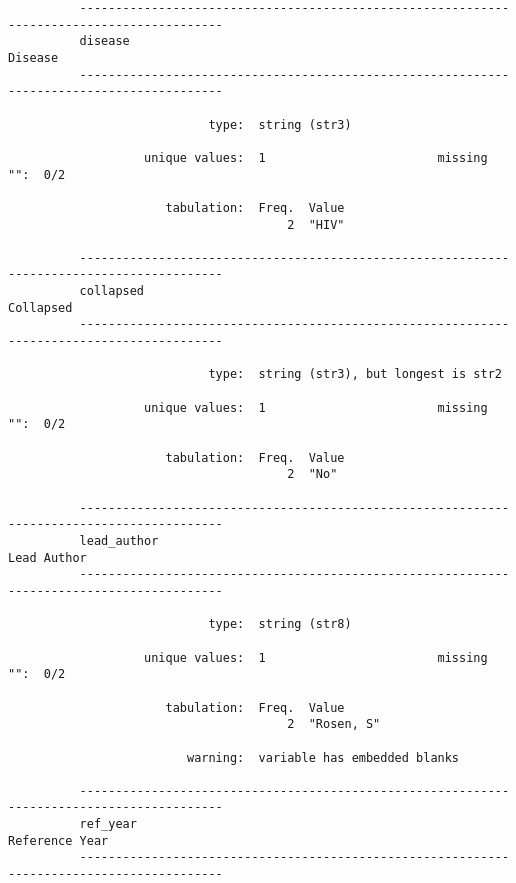 \documentclass{article}
\begin{document}
\begin{verbatim}
          
          
          
          ------------------------------------------------------------------------------------------
          disease                                                                            Disease
          ------------------------------------------------------------------------------------------
          
                            type:  string (str3)
          
                   unique values:  1                        missing "":  0/2
          
                      tabulation:  Freq.  Value
                                       2  "HIV"
          
          ------------------------------------------------------------------------------------------
          collapsed                                                                        Collapsed
          ------------------------------------------------------------------------------------------
          
                            type:  string (str3), but longest is str2
          
                   unique values:  1                        missing "":  0/2
          
                      tabulation:  Freq.  Value
                                       2  "No"
          
          ------------------------------------------------------------------------------------------
          lead_author                                                                    Lead Author
          ------------------------------------------------------------------------------------------
          
                            type:  string (str8)
          
                   unique values:  1                        missing "":  0/2
          
                      tabulation:  Freq.  Value
                                       2  "Rosen, S"
          
                         warning:  variable has embedded blanks
          
          ------------------------------------------------------------------------------------------
          ref_year                                                                    Reference Year
          ------------------------------------------------------------------------------------------
          

\end{verbatim}
\end{document}

